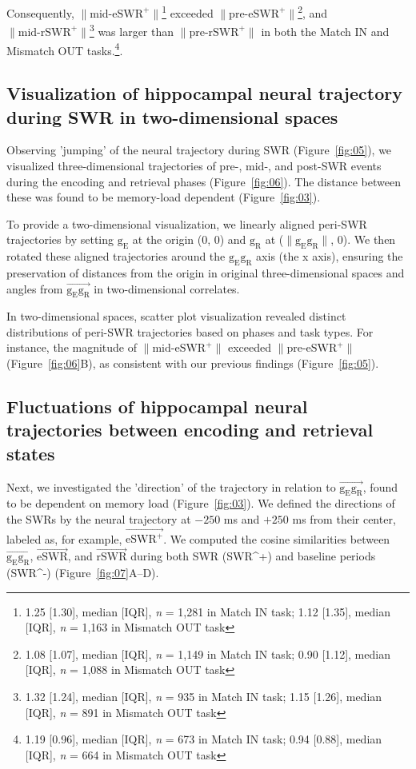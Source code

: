Consequently, $\mathrm{\lVert \text{mid-eSWR}^+ \rVert}$\footnote{1.25 [1.30], median [IQR], \textit{n} = 1,281 in Match IN task; 1.12 [1.35], median [IQR], \textit{n} = 1,163 in Mismatch OUT task} exceeded $\mathrm{\lVert \text{pre-eSWR}^+ \rVert}$\footnote{1.08 [1.07], median [IQR], \textit{n} = 1,149 in Match IN task; 0.90 [1.12], median [IQR], \textit{n} = 1,088 in Mismatch OUT task}, and $\mathrm{\lVert \text{mid-rSWR}^+ \rVert}$\footnote{1.32 [1.24], median [IQR], \textit{n} = 935 in Match IN task; 1.15 [1.26], median [IQR], \textit{n} = 891 in Mismatch OUT task} was larger than $\mathrm{\lVert \text{pre-rSWR}^+ \rVert}$ in both the Match IN and Mismatch OUT tasks.\footnote{1.19 [0.96], median [IQR], \textit{n} = 673 in Match IN task; 0.94 [0.88], median [IQR], \textit{n} = 664 in Mismatch OUT task}.

\subsection{Visualization of hippocampal neural trajectory during SWR in two-dimensional spaces}
Observing 'jumping' of the neural trajectory during SWR (Figure~\ref{fig:05}), we visualized three-dimensional trajectories of pre-, mid-, and post-SWR events during the encoding and retrieval phases (Figure~\ref{fig:06}). The distance between these was found to be memory-load dependent (Figure~\ref{fig:03}). 

To provide a two-dimensional visualization, we linearly aligned peri-SWR trajectories by setting $\mathrm{g_{E}}$ at the origin (0, 0) and $\mathrm{g_{R}}$ at ($\mathrm{\lVert g_{E}g_{R} \rVert}$, 0). We then rotated these aligned trajectories around the $\mathrm{g_{E}g_{R}}$ axis (the x axis), ensuring the preservation of distances from the origin in original three-dimensional spaces and angles from $\overrightarrow{\mathrm{g_{E}g_{R}}}$ in two-dimensional correlates.

In two-dimensional spaces, scatter plot visualization revealed distinct distributions of peri-SWR trajectories based on phases and task types. For instance, the magnitude of $\mathrm{\lVert \text{mid-eSWR}^+ \rVert}$ exceeded $\mathrm{\lVert \text{pre-eSWR}^+ \rVert}$ (Figure~\ref{fig:06}B), as consistent with our previous findings (Figure~\ref{fig:05}).

\subsection{Fluctuations of hippocampal neural trajectories between encoding and retrieval states}
Next, we investigated the 'direction' of the trajectory in relation to $\overrightarrow{\mathrm{g_{E}g_{R}}}$, found to be dependent on memory load (Figure~\ref{fig:03}). We defined the directions of the SWRs by the neural trajectory at $-250$ ms and $+250$ ms from their center, labeled as, for example, $\overrightarrow{\mathrm{eSWR^+}}$. We computed the cosine similarities between $\overrightarrow{\mathrm{g_{E}g_{R}}}$, $\overrightarrow{\mathrm{eSWR}}$, and $\overrightarrow{\mathrm{rSWR}}$ during both SWR (SWR^+) and baseline periods (SWR^-) (Figure~\ref{fig:07}A--D).

